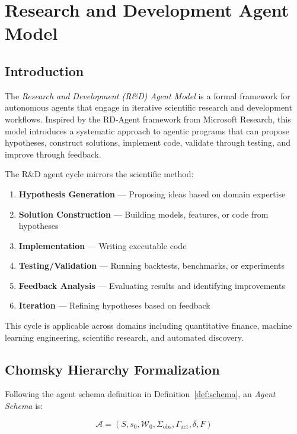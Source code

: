 \section{Research and Development Agent Model}
\label{sec:rd_agent}

\subsection{Introduction}

The \emph{Research and Development (R\&D) Agent Model} is a formal framework for autonomous agents that engage in iterative scientific research and development workflows. Inspired by the RD-Agent framework from Microsoft Research, this model introduces a systematic approach to agentic programs that can propose hypotheses, construct solutions, implement code, validate through testing, and improve through feedback.

\bigskip

The R\&D agent cycle mirrors the scientific method:

\begin{enumerate}
\item \textbf{Hypothesis Generation} --- Proposing ideas based on domain expertise
\item \textbf{Solution Construction} --- Building models, features, or code from hypotheses  
\item \textbf{Implementation} --- Writing executable code
\item \textbf{Testing/Validation} --- Running backtests, benchmarks, or experiments
\item \textbf{Feedback Analysis} --- Evaluating results and identifying improvements
\item \textbf{Iteration} --- Refining hypotheses based on feedback
\end{enumerate}

This cycle is applicable across domains including quantitative finance, machine learning engineering, scientific research, and automated discovery.

\subsection{Chomsky Hierarchy Formalization}

Following the agent schema definition in Definition~\ref{def:schema}, an \emph{Agent Schema} is:

\[
\mathcal{A} = (S, s_0, \mathcal{W}_0, \Sigma_{\mathrm{obs}}, \Gamma_{\mathrm{act}}, \delta, F)
\]


